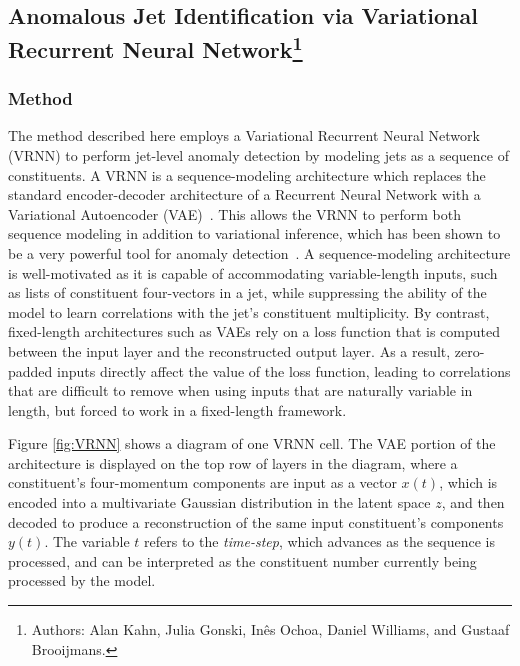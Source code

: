 \documentclass[a4paper,11pt]{article}
\begin{document}
\subsection[Anomalous Jet Identification via Variational Recurrent Neural Network]{Anomalous Jet Identification via Variational Recurrent Neural Network\footnote{Authors: Alan Kahn, Julia Gonski, In\^{e}s Ochoa, Daniel Williams, and Gustaaf Brooijmans.}}

\label{sec:vrnn}



\subsubsection{Method}
\label{sec:methodvnn}



The method described here employs a Variational Recurrent Neural Network (VRNN) to perform jet-level anomaly detection by modeling jets as a sequence of constituents. A VRNN is a sequence-modeling architecture which replaces the standard encoder-decoder architecture of a Recurrent Neural Network with a Variational Autoencoder (VAE)~\cite{chung2016recurrent}. 
This allows the VRNN to perform both sequence modeling in addition to variational inference, which has been shown to be a very powerful tool for anomaly detection~\cite{An2015VariationalAB}.
A sequence-modeling architecture is well-motivated as it is capable of accommodating variable-length inputs, such as lists of constituent four-vectors in a jet, while suppressing the ability of the model to learn correlations with the jet's constituent multiplicity.
By contrast, fixed-length architectures such as VAEs rely on a loss function that is computed between the input layer and the reconstructed output layer. As a result, zero-padded inputs directly affect the value of the loss function, leading to correlations that are difficult to remove when using inputs that are naturally variable in length, but forced to work in a fixed-length framework. 

Figure \ref{fig:VRNN} shows a diagram of one VRNN cell. The VAE portion of the architecture is displayed on the top row of layers in the diagram, where a constituent's four-momentum components are input as a vector $x(t)$, which is encoded into a multivariate Gaussian distribution in the latent space $z$, and then decoded to produce a reconstruction of the same input constituent's components $y(t)$. The variable $t$ refers to the \textit{time-step}, which advances as the sequence is processed, and can be interpreted as the constituent number currently being processed by the model. 
\end{document}
